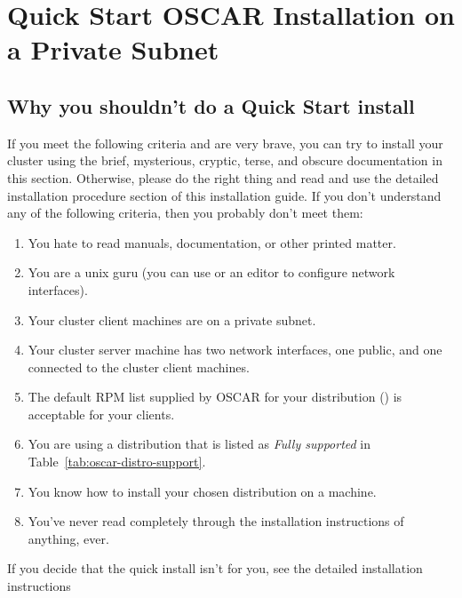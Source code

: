 %
%
%

\section{Quick Start OSCAR Installation on a Private Subnet}


\subsection{Why you shouldn't do a Quick Start install}

If you meet the following criteria and are very brave, you can try to
install your cluster using the brief, mysterious, cryptic, terse, and
obscure documentation in this section.  Otherwise, please do the right
thing and read and use the detailed installation procedure section of
this installation guide.  If you don't understand any of the following
criteria, then you probably don't meet them:

\begin{enumerate}
\item You hate to read manuals, documentation, or other printed
  matter.
\item You are a unix guru (you can use  or an editor to
  configure network interfaces).
\item Your cluster client machines are on a private subnet.
\item Your cluster server machine has two network interfaces, one
  public, and one connected to the cluster client machines.
\item The default RPM list supplied by OSCAR for your distribution
  ()
  is acceptable for your clients.
\item You are using a distribution that is listed as \emph{Fully
    supported} in Table~\ref{tab:oscar-distro-support}.
\item You know how to install your chosen distribution on a machine.
\item You've never read completely through the installation
  instructions of anything, ever.
\end{enumerate}

\docswitch{}{}

If you decide that the quick install isn't for you, see the detailed
installation instructions 

